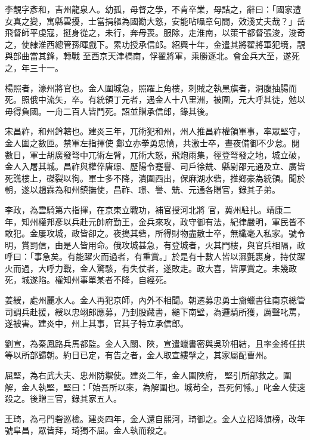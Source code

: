 \begin{pinyinscope}
 李靚字彥和，吉州龍泉人。幼孤，母督之學，不肯卒業，母詰之，辭曰：「國家遭女真之變，寓縣雲擾，士當捐軀為國勘大憝，安能呫囁章句間，效淺丈夫哉？」岳飛督師平虔寇，挺身從之，未行，奔母喪。服除，走淮南，以策干都督張浚，浚奇之，使隸淮西總管孫暉戲下。累功授承信郎。紹興十年，金遣其將翟將軍犯境，靚與部曲當其鋒，轉戰
 至西京天津橋南，俘翟將軍，乘勝逐北。會金兵大至，遂死之，年三十一。



 楊照者，濠州將官也。金人圍城急，照躍上角樓，刺賊之執黑旗者，洞腹抽腸而死。照俄中流矢，卒。有統領丁元者，遇金人十八里洲，被圍，元大呼其徒，勉以毋得負國。一舟二百人皆鬥死。詔並贈承信郎，錄其後。



 宋昌祚，和州鈐轄也。建炎三年，兀術犯和州，州人推昌祚權領軍事，率眾堅守，金人圍之數匝。禁軍左指揮使
 鄭立亦拳勇忠憤，共激士卒，晝夜備御不少怠。閱數日，軍士胡廣發弩中兀術左臂，兀術大怒，飛炮雨集，徑登弩發之地，城立破，金人入屠其城。昌祚與權倅唐璟、歷陽令蹇譽、司戶徐兟、縣尉邵元通及立、廣皆死譙樓上，磔裂以徇。軍士多不降，潰圍西出，保麻湖水砦，推鄉豪為統領。聞於朝，遂以趙霖為和州鎮撫使，昌祚、璟、譽、兟、元通各贈官，錄其子弟。



 李政，為雲騎第六指揮，在京東立戰功，補官授河北將
 官，冀州駐扎。靖康二年，知州權邦彥以兵赴元帥府勤王，金兵來攻，政守御有法，紀律嚴明，軍民皆不敢犯。金屢攻城，政皆卻之。夜搗其砦，所得財物盡散士卒，無纖毫入私家。號令明，賞罰信，由是人皆用命。俄攻城甚急，有登城者，火其門樓，與官兵相隔，政呼曰：「事急矣。有能躍火而過者，有重賞。」於是有十數人皆以濕氈裹身，持仗躍火而過，大呼力戰，金人驚駭，有失仗者，遂敗走。政大喜，皆厚賞之。未幾政死，城遂陷。權知州事單某者不降，自經死。



 姜綬，處州麗水人。金人再犯京師，內外不相聞。朝遷募忠勇士齎蠟書往南京總管司調兵赴援，綬以忠翊郎應募，乃刲股藏書，縋下南壁，為邏騎所獲，厲聲叱罵，遂被害。建炎中，州上其事，官其子特立承信郎。



 劉宣，為秦鳳路兵馬都監。金人入關、陜，宣遣蠟書密與吳玠相結，且率金將任拱等以所部歸朝。約日已定，有告之者，金人取宣縷擘之，其家屬配曹州。



 屈堅，為右武大夫、忠州防禦使。建炎二年，金人圍陜府，
 堅引所部救之。圍解，金人執堅，堅曰：「始吾所以來，為解圍也。城茍全，吾死何憾。」叱金人使速殺之。後贈三官，錄其家五人。



 王琦，為弓門砦巡檢。建炎四年，金人還自熙河，琦御之。金人立招降旗榜，改年號阜昌，眾皆拜，琦獨不屈。金人執而殺之。




\end{pinyinscope}
